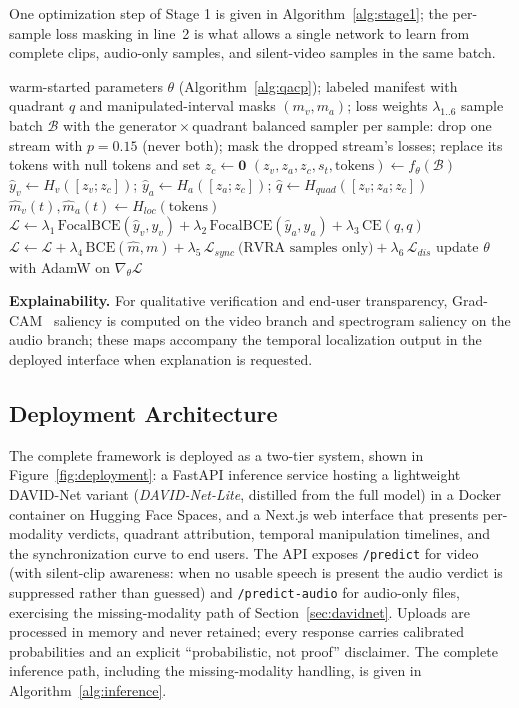 One optimization step of Stage 1 is given in Algorithm~\ref{alg:stage1}; the
per-sample loss masking in line~2 is what allows a single network to learn
from complete clips, audio-only samples, and silent-video samples in the
same batch.

\begin{algorithm}[htbp]
\caption{Stage-1 multi-task optimization step of DAVID-Net}
\label{alg:stage1}
\begin{algorithmic}[1]
\Require warm-started parameters $\theta$ (Algorithm~\ref{alg:qacp});
  labeled manifest with quadrant $q$ and manipulated-interval masks
  $(m_v, m_a)$; loss weights $\lambda_{1..6}$
\State sample batch $\mathcal{B}$ with the generator\,$\times$\,quadrant
  balanced sampler
\State per sample: drop one stream with $p = 0.15$ (never both); mask the
  dropped stream's losses; replace its tokens with null tokens and set
  $z_c \gets \mathbf{0}$
\State $(z_v, z_a, z_c, s_t, \text{tokens}) \gets f_\theta(\mathcal{B})$
\State $\hat{y}_v \gets H_v([z_v; z_c])$;\quad
  $\hat{y}_a \gets H_a([z_a; z_c])$;\quad
  $\hat{q} \gets H_{quad}([z_v; z_a; z_c])$
\State $\hat{m}_v(t), \hat{m}_a(t) \gets H_{loc}(\text{tokens})$
\State $\mathcal{L} \gets
  \lambda_1\,\mathrm{FocalBCE}(\hat{y}_v, y_v) +
  \lambda_2\,\mathrm{FocalBCE}(\hat{y}_a, y_a) +
  \lambda_3\,\mathrm{CE}(\hat{q}, q)$
\State $\mathcal{L} \gets \mathcal{L} +
  \lambda_4\,\mathrm{BCE}(\hat{m}, m) +
  \lambda_5\,\mathcal{L}_{sync}\ \text{(RVRA samples only)} +
  \lambda_6\,\mathcal{L}_{dis}$
\State update $\theta$ with AdamW on $\nabla_\theta \mathcal{L}$
\end{algorithmic}
\end{algorithm}

\textbf{Explainability.} For qualitative verification and end-user
transparency, Grad-CAM~\cite{selvaraju2017gradcam} saliency is computed on
the video branch and spectrogram saliency on the audio branch; these maps
accompany the temporal localization output in the deployed interface when
explanation is requested.

\subsection{Deployment Architecture}
The complete framework is deployed as a two-tier system, shown in
Figure~\ref{fig:deployment}: a FastAPI inference service hosting a
lightweight DAVID-Net variant (\emph{DAVID-Net-Lite}, distilled from the full
model) in a Docker container on Hugging Face Spaces, and a Next.js web
interface that presents per-modality verdicts, quadrant attribution, temporal
manipulation timelines, and the synchronization curve to end users. The API
exposes \texttt{/predict} for video (with silent-clip awareness: when no
usable speech is present the audio verdict is suppressed rather than
guessed) and \texttt{/predict-audio} for audio-only files, exercising the
missing-modality path of Section~\ref{sec:davidnet}. Uploads are processed
in memory and never retained; every response carries calibrated
probabilities and an explicit ``probabilistic, not proof'' disclaimer.
The complete inference path, including the missing-modality handling, is
given in Algorithm~\ref{alg:inference}.

